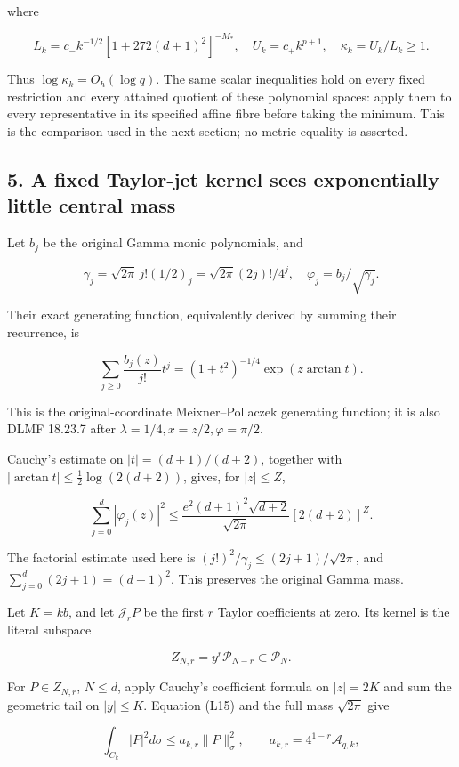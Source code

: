 where

\[
L_k=c_-k^{-1/2}[1+272(d+1)^2]^{-M_*},\quad
U_k=c_+k^{p+1},\quad\kappa_k=U_k/L_k\ge1.
\tag{L13}
\]

Thus \(\log\kappa_k=O_h(\log q)\). The same scalar inequalities hold on every fixed restriction and every attained quotient of these polynomial spaces: apply them to every representative in its specified affine fibre before taking the minimum. This is the comparison used in the next section; no metric equality is asserted.

\subsection{5. A fixed Taylor-jet kernel sees exponentially little central mass}\label{a-fixed-taylor-jet-kernel-sees-exponentially-little-central-mass}

Let \(b_j\) be the original Gamma monic polynomials, and

\[
\gamma_j=\sqrt{2\pi}\,j!(1/2)_j
=\sqrt{2\pi}(2j)!/4^j,\quad \varphi_j=b_j/\sqrt{\gamma_j}.
\]

Their exact generating function, equivalently derived by summing their recurrence, is

\[
\sum_{j\ge0}\frac{b_j(z)}{j!}t^j
=(1+t^2)^{-1/4}\exp(z\arctan t).
\tag{L14}
\]

This is the original-coordinate Meixner--Pollaczek generating function; it is also DLMF 18.23.7 after \(\lambda=1/4,x=z/2,\varphi=\pi/2\).

Cauchy's estimate on \(|t|=(d+1)/(d+2)\), together with
\(|\arctan t|\le\frac12\log(2(d+2))\), gives, for \(|z|\le Z\),

\[
\sum_{j=0}^d|\varphi_j(z)|^2
\le\frac{e^2(d+1)^2\sqrt{d+2}}{\sqrt{2\pi}}
[2(d+2)]^Z.
\tag{L15}
\]

The factorial estimate used here is
\((j!)^2/\gamma_j\le(2j+1)/\sqrt{2\pi}\), and
\(\sum_{j=0}^d(2j+1)=(d+1)^2\). This preserves the original Gamma mass.

Let \(K=kb\), and let \(\mathcal J_rP\) be the first \(r\) Taylor coefficients at zero. Its kernel is the literal subspace

\[
Z_{N,r}=y^r\mathcal P_{N-r}\subset\mathcal P_N.
\tag{L16}
\]

For \(P\in Z_{N,r}\), \(N\le d\), apply Cauchy's coefficient formula on \(|z|=2K\) and sum the geometric tail on \(|y|\le K\). Equation (L15) and the full mass \(\sqrt{2\pi}\) give

\[
\boxed{\int_{C_k}|P|^2d\sigma\le a_{k,r}\|P\|_\sigma^2,\qquad
 a_{k,r}=4^{1-r}\mathcal A_{q,k},}
\tag{L17}
\]

